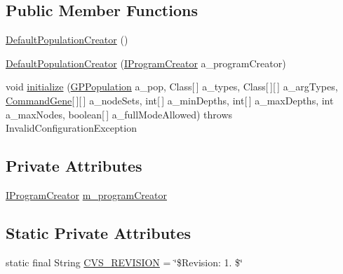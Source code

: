 \subsection*{Public Member Functions}
\begin{DoxyCompactItemize}
\item 
\hyperlink{classorg_1_1jgap_1_1gp_1_1impl_1_1_default_population_creator_a137f148da92bc5cab2d5818067b5a825}{Default\-Population\-Creator} ()
\item 
\hyperlink{classorg_1_1jgap_1_1gp_1_1impl_1_1_default_population_creator_a6292e85268580f7b311cb6c491e52cac}{Default\-Population\-Creator} (\hyperlink{interfaceorg_1_1jgap_1_1gp_1_1_i_program_creator}{I\-Program\-Creator} a\-\_\-program\-Creator)
\item 
void \hyperlink{classorg_1_1jgap_1_1gp_1_1impl_1_1_default_population_creator_af6c38314bce32cc040b6beaa0160521f}{initialize} (\hyperlink{classorg_1_1jgap_1_1gp_1_1impl_1_1_g_p_population}{G\-P\-Population} a\-\_\-pop, Class\mbox{[}$\,$\mbox{]} a\-\_\-types, Class\mbox{[}$\,$\mbox{]}\mbox{[}$\,$\mbox{]} a\-\_\-arg\-Types, \hyperlink{classorg_1_1jgap_1_1gp_1_1_command_gene}{Command\-Gene}\mbox{[}$\,$\mbox{]}\mbox{[}$\,$\mbox{]} a\-\_\-node\-Sets, int\mbox{[}$\,$\mbox{]} a\-\_\-min\-Depths, int\mbox{[}$\,$\mbox{]} a\-\_\-max\-Depths, int a\-\_\-max\-Nodes, boolean\mbox{[}$\,$\mbox{]} a\-\_\-full\-Mode\-Allowed)  throws Invalid\-Configuration\-Exception 
\end{DoxyCompactItemize}
\subsection*{Private Attributes}
\begin{DoxyCompactItemize}
\item 
\hyperlink{interfaceorg_1_1jgap_1_1gp_1_1_i_program_creator}{I\-Program\-Creator} \hyperlink{classorg_1_1jgap_1_1gp_1_1impl_1_1_default_population_creator_a612e53be286937cc3301a3fb09c932ff}{m\-\_\-program\-Creator}
\end{DoxyCompactItemize}
\subsection*{Static Private Attributes}
\begin{DoxyCompactItemize}
\item 
static final String \hyperlink{classorg_1_1jgap_1_1gp_1_1impl_1_1_default_population_creator_a79107b89608ef8eaf1e2fe6bbc054ddb}{C\-V\-S\-\_\-\-R\-E\-V\-I\-S\-I\-O\-N} = \char`\"{}\$Revision\-: 1. \$\char`\"{}
\end{DoxyCompactItemize}
